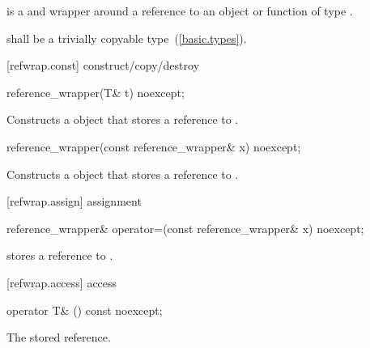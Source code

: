 \pnum
{} is a  and  wrapper
around a reference to an object or function of type .

\pnum
{} shall be a trivially copyable type~(\ref{basic.types}).

[refwrap.const]{ construct/copy/destroy}

%
\begin{itemdecl}
reference_wrapper(T& t) noexcept;
\end{itemdecl}

\begin{itemdescr}
\pnum
\effects Constructs a  object that stores a
reference to .
\end{itemdescr}

%
\begin{itemdecl}
reference_wrapper(const reference_wrapper& x) noexcept;
\end{itemdecl}

\begin{itemdescr}
\pnum\effects Constructs a  object that
stores a reference to .
\end{itemdescr}

[refwrap.assign]{ assignment}

%
\begin{itemdecl}
reference_wrapper& operator=(const reference_wrapper& x) noexcept;
\end{itemdecl}

\begin{itemdescr}
\pnum\postconditions {} stores a reference to  .
\end{itemdescr}

[refwrap.access]{ access}

%
\begin{itemdecl}
operator T& () const noexcept;
\end{itemdecl}

\begin{itemdescr}
\pnum\returns The stored reference.
\end{itemdescr}

